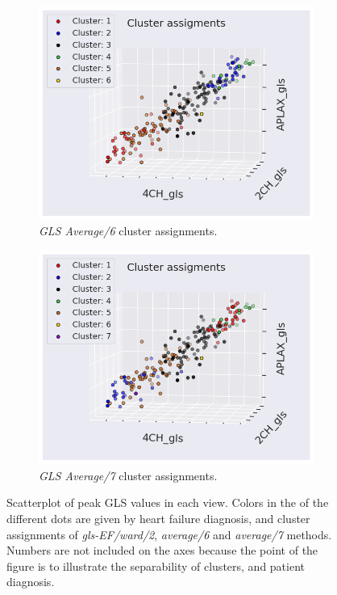 \begin{figure}[H]
\begin{subfigure}[b]{0.49\textwidth}
        \label{fig:scatter_gls_ef_ward2_ind}
    \end{subfigure}\\
    \begin{subfigure}[b]{0.49\textwidth}
        \centering
        \includegraphics[width=0.99\textwidth]{results/pd/scatter_gls_average6.png}
        \caption{\textit{GLS Average/6} cluster assignments.}
        \label{fig:scatter_gls_average6}
    \end{subfigure}
    \begin{subfigure}[b]{0.49\textwidth}
        \centering
        \includegraphics[width=0.99\textwidth]{results/pd/scatter_gls_average7.png}
        \caption{\textit{GLS Average/7} cluster assignments.}
        \label{fig:scatter_gls_average7}
    \end{subfigure}
    \caption{Scatterplot of peak GLS values in each view. Colors in the of the different dots are given by heart failure diagnosis, and cluster assignments of 
             \textit{gls-EF/ward/2}, \textit{average/6} and \textit{average/7} methods. Numbers are not included on the axes because the point of the figure is to illustrate the separability 
             of clusters, and patient diagnosis.}
             \label{fig:scatter_gls_ind_cluster_assignments}
\end{figure}


